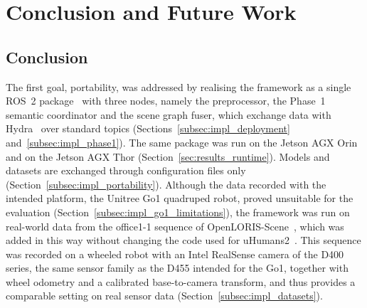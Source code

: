 \chapter{Conclusion and Future Work}
\label{chap:conclusion}
\label{chap:limitations}

\section{Conclusion}
\label{sec:conclusion}

{\small The first goal, portability, was addressed by realising the framework as a single ROS~2 package~\cite{macenski2022ros2} with three nodes, namely the preprocessor, the Phase~1 semantic coordinator and the scene graph fuser, which exchange data with Hydra~\cite{hughes2022hydra} over standard topics (Sections~\ref{subsec:impl_deployment} and~\ref{subsec:impl_phase1}). The same package was run on the Jetson AGX Orin and on the Jetson AGX Thor (Section~\ref{sec:results_runtime}). Models and datasets are exchanged through configuration files only (Section~\ref{subsec:impl_portability}). Although the data recorded with the intended platform, the Unitree Go1 quadruped robot, proved unsuitable for the evaluation (Section~\ref{subsec:impl_go1_limitations}), the framework was run on real-world data from the office1-1 sequence of OpenLORIS-Scene~\cite{shi2020openloris}, which was added in this way without changing the code used for uHumans2~\cite{rosinol2021kimera}. This sequence was recorded on a wheeled robot with an Intel RealSense camera of the D400 series, the same sensor family as the D455 intended for the Go1, together with wheel odometry and a calibrated base-to-camera transform, and thus provides a comparable setting on real sensor data (Section~\ref{subsec:impl_datasets}).\par}

